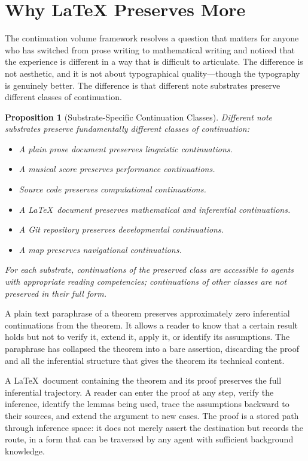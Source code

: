 \documentclass[12pt, a4paper]{article}
\theoremstyle{plain}
\newtheorem{proposition}[theorem]{Proposition}
\theoremstyle{definition}
\theoremstyle{remark}
\begin{document}
\section{Why LaTeX Preserves More}

The continuation volume framework resolves a question that matters for anyone who
has switched from prose writing to mathematical writing and noticed that the
experience is different in a way that is difficult to articulate. The difference
is not aesthetic, and it is not about typographical quality---though the typography
is genuinely better. The difference is that different note substrates preserve
different classes of continuation.

\begin{proposition}[Substrate-Specific Continuation Classes]
Different note substrates preserve fundamentally different classes of continuation:
\begin{itemize}
\item A plain prose document preserves linguistic continuations.
\item A musical score preserves performance continuations.
\item Source code preserves computational continuations.
\item A \LaTeX\ document preserves mathematical and inferential continuations.
\item A Git repository preserves developmental continuations.
\item A map preserves navigational continuations.
\end{itemize}
For each substrate, continuations of the preserved class are accessible to agents
with appropriate reading competencies; continuations of other classes are not
preserved in their full form.
\end{proposition}

A plain text paraphrase of a theorem preserves approximately zero inferential
continuations from the theorem. It allows a reader to know that a certain result
holds but not to verify it, extend it, apply it, or identify its assumptions. The
paraphrase has collapsed the theorem into a bare assertion, discarding the proof
and all the inferential structure that gives the theorem its technical content.

A \LaTeX\ document containing the theorem and its proof preserves the full
inferential trajectory. A reader can enter the proof at any step, verify the
inference, identify the lemmas being used, trace the assumptions backward to their
sources, and extend the argument to new cases. The proof is a stored path through
inference space: it does not merely assert the destination but records the route,
in a form that can be traversed by any agent with sufficient background knowledge.
\end{document}
